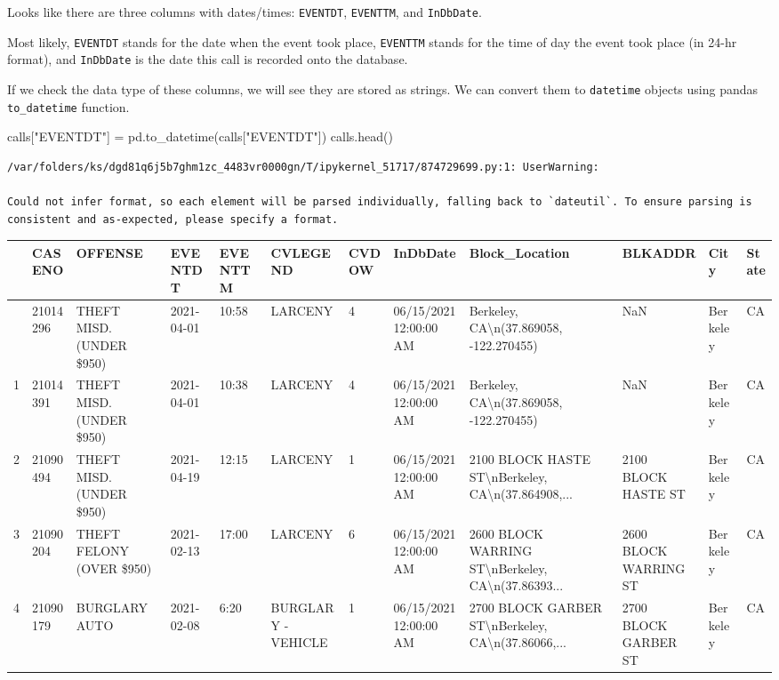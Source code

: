 \documentclass[
  letterpaper,
  DIV=11,
  numbers=noendperiod]{scrreprt}
\newenvironment{Shaded}{\begin{snugshade}}{\end{snugshade}}
\newcommand{\NormalTok}[1]{\textcolor[rgb]{0.00,0.23,0.31}{#1}}
\newcommand{\OperatorTok}[1]{\textcolor[rgb]{0.37,0.37,0.37}{#1}}
\newcommand{\StringTok}[1]{\textcolor[rgb]{0.13,0.47,0.30}{#1}}
\begin{document}
Looks like there are three columns with dates/times: \texttt{EVENTDT},
\texttt{EVENTTM}, and \texttt{InDbDate}.

Most likely, \texttt{EVENTDT} stands for the date when the event took
place, \texttt{EVENTTM} stands for the time of day the event took place
(in 24-hr format), and \texttt{InDbDate} is the date this call is
recorded onto the database.

If we check the data type of these columns, we will see they are stored
as strings. We can convert them to \texttt{datetime} objects using
pandas \texttt{to\_datetime} function.

\begin{Shaded}
\begin{Highlighting}[]
\NormalTok{calls[}\StringTok{"EVENTDT"}\NormalTok{] }\OperatorTok{=}\NormalTok{ pd.to\_datetime(calls[}\StringTok{"EVENTDT"}\NormalTok{])}
\NormalTok{calls.head()}
\end{Highlighting}
\end{Shaded}

\begin{verbatim}
/var/folders/ks/dgd81q6j5b7ghm1zc_4483vr0000gn/T/ipykernel_51717/874729699.py:1: UserWarning:

Could not infer format, so each element will be parsed individually, falling back to `dateutil`. To ensure parsing is consistent and as-expected, please specify a format.
\end{verbatim}

\begin{longtable}[]{@{}llllllllllll@{}}
\toprule\noalign{}
& CASENO & OFFENSE & EVENTDT & EVENTTM & CVLEGEND & CVDOW & InDbDate &
Block\_Location & BLKADDR & City & State \\
\midrule\noalign{}
\endhead
\bottomrule\noalign{}
\endlastfoot
0 & 21014296 & THEFT MISD. (UNDER \$950) & 2021-04-01 & 10:58 & LARCENY
& 4 & 06/15/2021 12:00:00 AM & Berkeley, CA\textbackslash n(37.869058,
-122.270455) & NaN & Berkeley & CA \\
1 & 21014391 & THEFT MISD. (UNDER \$950) & 2021-04-01 & 10:38 & LARCENY
& 4 & 06/15/2021 12:00:00 AM & Berkeley, CA\textbackslash n(37.869058,
-122.270455) & NaN & Berkeley & CA \\
2 & 21090494 & THEFT MISD. (UNDER \$950) & 2021-04-19 & 12:15 & LARCENY
& 1 & 06/15/2021 12:00:00 AM & 2100 BLOCK HASTE
ST\textbackslash nBerkeley, CA\textbackslash n(37.864908,... & 2100
BLOCK HASTE ST & Berkeley & CA \\
3 & 21090204 & THEFT FELONY (OVER \$950) & 2021-02-13 & 17:00 & LARCENY
& 6 & 06/15/2021 12:00:00 AM & 2600 BLOCK WARRING
ST\textbackslash nBerkeley, CA\textbackslash n(37.86393... & 2600 BLOCK
WARRING ST & Berkeley & CA \\
4 & 21090179 & BURGLARY AUTO & 2021-02-08 & 6:20 & BURGLARY - VEHICLE &
1 & 06/15/2021 12:00:00 AM & 2700 BLOCK GARBER
ST\textbackslash nBerkeley, CA\textbackslash n(37.86066,... & 2700 BLOCK
GARBER ST & Berkeley & CA \\
\end{longtable}
\end{document}
